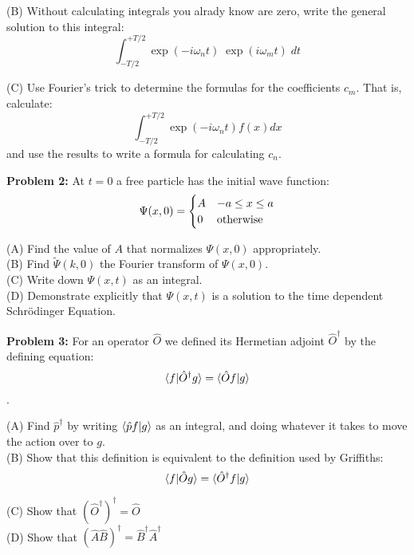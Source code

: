 \documentclass[12pt]{article}
\begin{document}
\noindent
(B) Without calculating integrals you alrady know are zero, write the general solution to this integral:
$$ \int_{-T/2}^{+T/2} \exp(-i \omega_n t) \; \exp(i \omega_m t)  \; dt $$

\noindent
(C) Use Fourier's trick to determine the formulas for the coefficients $c_m$.  That is, calculate:
$$ \int_{-T/2}^{+T/2} \exp(-i \omega_n t) f(x) dx $$
and use the results to write a formula for calculating $c_n$.

\newpage

\noindent
{\bf Problem 2:} At $t=0$ a free particle has the initial wave function:
$$ \Psi(x,0) = 
\begin{cases}    
A & -a \leq x \leq a \\
0 & {\rm otherwise} \\
\end{cases} 
$$

\noindent
(A) Find the value of $A$ that normalizes $\Psi(x,0)$ appropriately.\\

\noindent
(B) Find $\widetilde{\Psi}(k,0)$ the Fourier transform of $\Psi(x,0)$.\\

\noindent
(C) Write down $\Psi(x,t)$ as an integral.\\

\noindent
(D) Demonstrate explicitly that $\Psi(x,t)$ is a solution to the time dependent Schr\"odinger Equation.\\

\vskip 2cm

\noindent
{\bf Problem 3:} For an operator $\hat{O}$ we defined its Hermetian adjoint $\hat{O}^\dagger$ by the defining equation:
$$\braket{f|\hat{O}^\dagger g} = \braket{\hat{O} f | g}$$.

\noindent
(A) Find $\hat{p}^\dagger$ by writing $\braket{\hat{p} f | g}$ as an integral, and doing whatever it takes to move the action over to $g$.\\[5pt]

\noindent
(B) Show that this definition is equivalent to the definition used by Griffiths:
$$\braket{f|\hat{O} g} = \braket{\hat{O}^\dagger f | g}$$

\noindent
(C) Show that $\left(\hat{O}^\dagger\right)^\dagger = \hat{O}$\\[5pt]

\noindent
(D) Show that $\left(\hat{A}\hat{B}\right)^\dagger = \hat{B}^\dagger\hat{A}^\dagger$\\[5pt]
\end{document}
